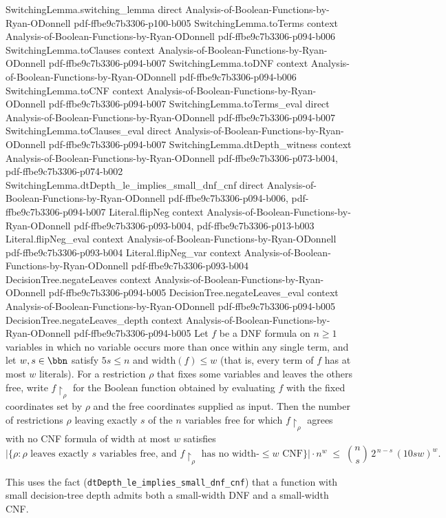 \begin{theorem}
  {SwitchingLemma.switching_lemma}
  {direct}
  {Analysis-of-Boolean-Functions-by-Ryan-ODonnell}
  {pdf-ffbe9c7b3306-p100-b005}
\proofstep
  {SwitchingLemma.toTerms}
  {context}
  {Analysis-of-Boolean-Functions-by-Ryan-ODonnell}
  {pdf-ffbe9c7b3306-p094-b006}
\proofstep
  {SwitchingLemma.toClauses}
  {context}
  {Analysis-of-Boolean-Functions-by-Ryan-ODonnell}
  {pdf-ffbe9c7b3306-p094-b007}
\proofstep
  {SwitchingLemma.toDNF}
  {context}
  {Analysis-of-Boolean-Functions-by-Ryan-ODonnell}
  {pdf-ffbe9c7b3306-p094-b006}
\proofstep
  {SwitchingLemma.toCNF}
  {context}
  {Analysis-of-Boolean-Functions-by-Ryan-ODonnell}
  {pdf-ffbe9c7b3306-p094-b007}
\proofstep
  {SwitchingLemma.toTerms_eval}
  {direct}
  {Analysis-of-Boolean-Functions-by-Ryan-ODonnell}
  {pdf-ffbe9c7b3306-p094-b007}
\proofstep
  {SwitchingLemma.toClauses_eval}
  {direct}
  {Analysis-of-Boolean-Functions-by-Ryan-ODonnell}
  {pdf-ffbe9c7b3306-p094-b007}
\proofstep
  {SwitchingLemma.dtDepth_witness}
  {context}
  {Analysis-of-Boolean-Functions-by-Ryan-ODonnell}
  {pdf-ffbe9c7b3306-p073-b004,
    pdf-ffbe9c7b3306-p074-b002}
\proofstep
  {SwitchingLemma.dtDepth_le_implies_small_dnf_cnf}
  {direct}
  {Analysis-of-Boolean-Functions-by-Ryan-ODonnell}
  {pdf-ffbe9c7b3306-p094-b006,
    pdf-ffbe9c7b3306-p094-b007}
\proofstep
  {Literal.flipNeg}
  {context}
  {Analysis-of-Boolean-Functions-by-Ryan-ODonnell}
  {pdf-ffbe9c7b3306-p093-b004,
    pdf-ffbe9c7b3306-p013-b003}
\proofstep
  {Literal.flipNeg_eval}
  {context}
  {Analysis-of-Boolean-Functions-by-Ryan-ODonnell}
  {pdf-ffbe9c7b3306-p093-b004}
\proofstep
  {Literal.flipNeg_var}
  {context}
  {Analysis-of-Boolean-Functions-by-Ryan-ODonnell}
  {pdf-ffbe9c7b3306-p093-b004}
\proofstep
  {DecisionTree.negateLeaves}
  {context}
  {Analysis-of-Boolean-Functions-by-Ryan-ODonnell}
  {pdf-ffbe9c7b3306-p094-b005}
\proofstep
  {DecisionTree.negateLeaves_eval}
  {context}
  {Analysis-of-Boolean-Functions-by-Ryan-ODonnell}
  {pdf-ffbe9c7b3306-p094-b005}
\proofstep
  {DecisionTree.negateLeaves_depth}
  {context}
  {Analysis-of-Boolean-Functions-by-Ryan-ODonnell}
  {pdf-ffbe9c7b3306-p094-b005}
\label{SwitchingLemma.switching_corollary}
Let $f$ be a DNF formula on $n \ge 1$ variables in which no variable occurs more than
once within any single term, and let $w, s \in \bbn$ satisfy $5s \le n$ and
$\mathrm{width}(f) \le w$ (that is, every term of $f$ has at most $w$ literals). For a
restriction $\rho$ that fixes some variables and leaves the others free, write
$f\!\restriction_\rho$ for the Boolean function obtained by evaluating $f$ with the
fixed coordinates set by $\rho$ and the free coordinates supplied as input. Then the
number of restrictions $\rho$ leaving exactly $s$ of the $n$ variables free for which
$f\!\restriction_\rho$ agrees with no CNF formula of width at most $w$ satisfies
\[
\bigl|\{\rho : \rho \text{ leaves exactly } s \text{ variables free, and }
f\!\restriction_\rho \text{ has no width-}{\le}w\text{ CNF}\}\bigr| \cdot n^{w}
  \;\le\; \binom{n}{s}\, 2^{\,n-s}\,(10sw)^{w}.
\]
\end{theorem}

\noindent
This uses the fact (\texttt{dtDepth\_le\_implies\_small\_dnf\_cnf}) that a function
with small decision-tree depth admits both a small-width DNF and a
small-width CNF.

